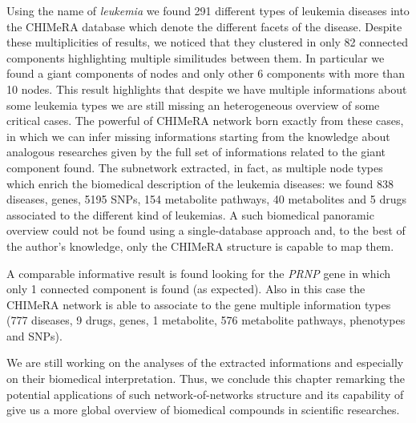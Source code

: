 \documentclass{standalone}
\begin{document}
Using the  name of \emph{leukemia} we found 291 different types of leukemia diseases into the \textsf{CHIMeRA} database which denote the different facets of the disease.
Despite these multiplicities of results, we noticed that they clustered in only 82 connected components highlighting multiple similitudes between them.
In particular we found a giant components of  nodes and only other 6 components with more than 10 nodes.
This result highlights that despite we have multiple informations about some leukemia types we are still missing an heterogeneous overview of some critical cases.
The powerful of \textsf{CHIMeRA} network born exactly from these cases, in which we can infer missing informations starting from the knowledge about analogous researches given by the full set of informations related to the giant component found.
The subnetwork extracted, in fact, as multiple node types which enrich the biomedical description of the leukemia diseases: we found 838 diseases,  genes, 5195 SNPs, 154 metabolite pathways, 40 metabolites and 5 drugs associated to the different kind of leukemias.
A such biomedical panoramic overview could not be found using a single-database approach and, to the best of the author's knowledge, only the \textsf{CHIMeRA} structure is capable to map them.

A comparable informative result is found looking for the \emph{PRNP} gene in which only 1 connected component is found (as expected).
Also in this case the \textsf{CHIMeRA} network is able to associate to the gene multiple information types (777 diseases, 9 drugs,  genes, 1 metabolite, 576 metabolite pathways,  phenotypes and  SNPs).

We are still working on the analyses of the extracted informations and especially on their biomedical interpretation.
Thus, we conclude this chapter remarking the potential applications of such network-of-networks structure and its capability of give us a more global overview of biomedical compounds in scientific researches.
\end{document}
